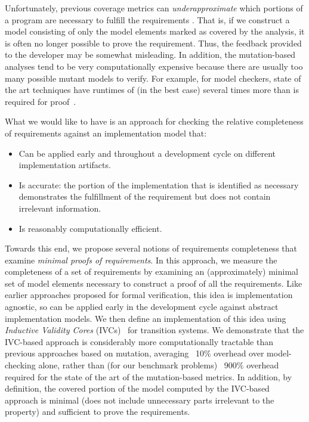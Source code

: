 Unfortunately, previous coverage metrics can {\em underapproximate} which portions of a program are necessary to fulfill the requirements \cite{}.  That is, if we construct a model consisting of only the model elements marked as covered by the analysis, it is often no longer possible to prove the requirement.  Thus, the feedback provided to the developer may be somewhat misleading.
In addition, the mutation-based analyses tend to be very computationally expensive because there are usually too many possible mutant models to verify.  For example, for model checkers, state of the art techniques have runtimes of (in the best case) several times more than is required for proof~\cite{chockler2010coverage}.

What we would like to have is an approach for checking the relative completeness of requirements against an implementation model that:
\begin{itemize}
    \item Can be applied early and throughout a development cycle on different implementation artifacts.
    \item Is accurate: the portion of the implementation that is identified as necessary demonstrates the
        fulfillment of the requirement but does not contain irrelevant information.
    \item Is reasonably computationally efficient.
\end{itemize}

\noindent Towards this end, we propose several notions of requirements completeness that examine {\em minimal proofs of requirements}.  In this approach, we measure the completeness of a set of requirements by examining an (approximately) minimal set of model elements necessary to construct a proof of all the requirements.  Like earlier approaches proposed for formal verification, this idea is implementation agnostic, so can be applied early in the development cycle against abstract implementation models.  We then define an implementation of this idea using {\em Inductive Validity Cores} (IVCs)~\cite{Ghass16} for transition systems.  We demonstrate that the IVC-based approach is considerably more computationally tractable than previous approaches based on mutation, averaging ~10\% overhead over model-checking alone, rather than (for our benchmark problems) ~900\% overhead required for the state of the art of the mutation-based metrics.  In addition, by definition, the covered portion of the model computed by the IVC-based approach is minimal (does not include unnecessary parts irrelevant to the property) and sufficient to prove the requirements.

